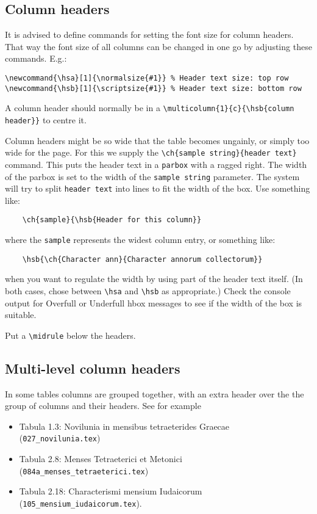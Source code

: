 \documentclass{report}
\begin{document}
\subsection{Column headers}
It is advised to define commands for setting the font size for column headers.
That way the font size of all columns can be changed in one go by adjusting
these commands. E.g.:
\begin{verbatim}
\newcommand{\hsa}[1]{\normalsize{#1}} % Header text size: top row
\newcommand{\hsb}[1]{\scriptsize{#1}} % Header text size: bottom row
\end{verbatim}

A column header should normally be in a
\verb+\multicolumn{1}{c}{\hsb{column header}}+
to centre it.

Column headers might be so wide that the table becomes ungainly, or simply
too wide for the page.
For this we supply the \verb+\ch{sample string}{header text}+ command.
This puts the header text in a \verb+parbox+ with a ragged right.
The width of the parbox is set to the width of the \verb+sample string+
parameter.
The system will try to split \verb+header text+ into lines to fit
the width of the box. Use something like:
\begin{verbatim}
	\ch{sample}{\hsb{Header for this column}}
\end{verbatim}
where the \verb+sample+ represents the widest column entry, or something like:
\begin{verbatim}
	\hsb{\ch{Character ann}{Character annorum collectorum}}
\end{verbatim}
when you want to regulate the width by using part of the header text itself.
(In both cases, chose between \verb+\hsa+ and \verb+\hsb+ as appropriate.)
Check the console output for Overfull or Underfull hbox messages to see
if the width of the box is suitable.

Put a \verb+\midrule+ below the headers.

\subsection{Multi-level column headers}
In some tables columns are grouped together, with an extra header over
the the group of columns and their headers.
See for example
\begin{itemize}
\item Tabula 1.3: Novilunia in mensibus tetraeterides Graecae
(\verb+027_novilunia.tex+)
\item Tabula 2.8: Menses Tetraeterici et Metonici
(\verb+084a_menses_tetraeterici.tex+)
\item Tabula 2.18: Characterismi mensium Iudaicorum
(\verb+105_mensium_iudaicorum.tex+).
\end{itemize}
\end{document}
